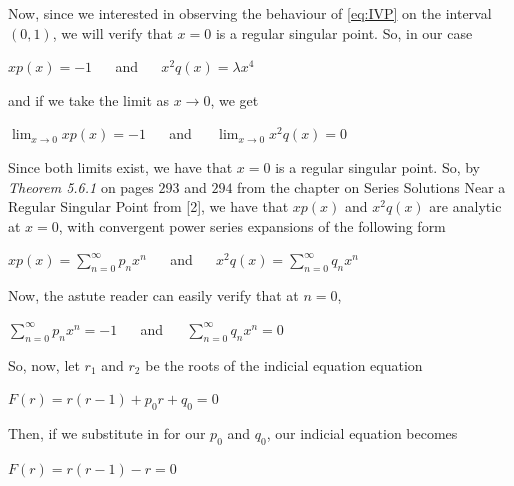 \documentclass[executivepaper]{article}
\begin{document}
Now, since we interested in observing the behaviour of \eqref{eq:IVP} on the interval $(0,1)$, we will verify that $x=0$ is a regular singular point. So, in our case

\begin{center}

$xp(x)=-1$ $\quad$ and $\quad$ $x^2q(x)=\lambda x^4$

\end{center}

and if we take the limit as $x \rightarrow 0$, we get

\begin{center}

$\lim_{x \to 0} xp(x)=-1$ $\quad$ and $\quad$ $\lim_{x \to 0} x^2q(x)=0$

\end{center}

Since both limits exist, we have that $x=0$ is a regular singular point. So, by \textit{Theorem 5.6.1} on pages $293$ and $294$ from the chapter on Series Solutions Near a Regular Singular Point from [2], we have that $xp(x)$ and $x^2q(x)$ are analytic at $x=0$, with convergent power series expansions of the following form

\begin{center}

$xp(x)=\sum_{n=0}^{\infty} p_{n} x^{n}$ $\quad$ and $\quad$ $x^2q(x)=\sum_{n=0}^{\infty} q_{n} x^{n}$

\end{center}

Now, the astute reader can easily verify that at $n=0$, 

\begin{center}

$\sum_{n=0}^{\infty} p_{n} x^{n}=-1$ $\quad$ and $\quad$ $\sum_{n=0}^{\infty} q_{n} x^{n}=0$

\end{center}

So, now, let $r_{1}$ and $r_{2}$ be the roots of the indicial equation equation

\begin{center}

$F(r)=r(r-1)+p_{0}r+q_{0}=0$

\end{center}

Then, if we substitute in for our $p_{0}$ and $q_{0}$, our indicial equation becomes

\begin{center}

$F(r)=r(r-1)-r=0$

\end{center}
\end{document}
